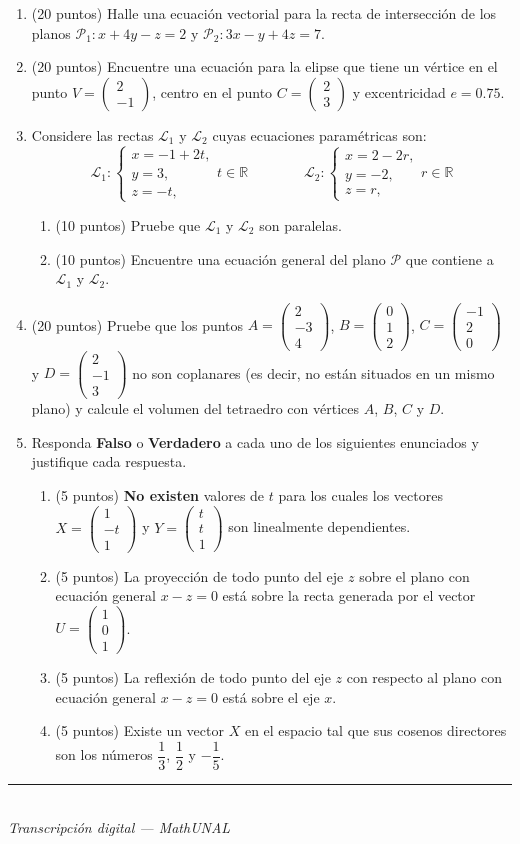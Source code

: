 \documentclass[11pt]{article}
\newcommand{\vect}[2]{\begin{pmatrix}#1\\#2\end{pmatrix}}
\newcommand{\vectiii}[3]{\begin{pmatrix}#1\\#2\\#3\end{pmatrix}}
\newcommand{\examfooter}{%
  \vfill
  \rule{\linewidth}{0.4pt}\\[1pt]
  {\scriptsize\textit{Transcripción digital --- MathUNAL}\hfill\textcolor{unalblue}{\textbf{\thepage}}}
}
\begin{document}
\begin{enumerate}
\item (20 puntos) Halle una ecuación vectorial para la recta de intersección de los planos $\mathcal{P}_1: x+4y-z=2$ y $\mathcal{P}_2: 3x-y+4z=7$.

\item (20 puntos) Encuentre una ecuación para la elipse que tiene un vértice en el punto $V=\vect{2}{-1}$, centro en el punto $C=\vect{2}{3}$ y excentricidad $e=0.75$.

\item Considere las rectas $\mathcal{L}_1$ y $\mathcal{L}_2$ cuyas ecuaciones paramétricas son:
$$\mathcal{L}_1:\begin{cases}x=-1+2t,\\ y=3,\\ z=-t,\end{cases} t\in\mathbb{R}\qquad\qquad \mathcal{L}_2:\begin{cases}x=2-2r,\\ y=-2,\\ z=r,\end{cases} r\in\mathbb{R}$$

\begin{enumerate}[label=(\alph*)]
\item (10 puntos) Pruebe que $\mathcal{L}_1$ y $\mathcal{L}_2$ son paralelas.
\item (10 puntos) Encuentre una ecuación general del plano $\mathcal{P}$ que contiene a $\mathcal{L}_1$ y $\mathcal{L}_2$.
\end{enumerate}

\item (20 puntos) Pruebe que los puntos $A=\vectiii{2}{-3}{4}$, $B=\vectiii{0}{1}{2}$, $C=\vectiii{-1}{2}{0}$ y $D=\vectiii{2}{-1}{3}$ no son coplanares (es decir, no están situados en un mismo plano) y calcule el volumen del tetraedro con vértices $A$, $B$, $C$ y $D$.

\item Responda \textbf{Falso} o \textbf{Verdadero} a cada uno de los siguientes enunciados y justifique cada respuesta.

\begin{enumerate}[label=(\alph*)]
\item (5 puntos) \textbf{No existen} valores de $t$ para los cuales los vectores $X=\vectiii{1}{-t}{1}$ y $Y=\vectiii{t}{t}{1}$ son linealmente dependientes.
\item (5 puntos) La proyección de todo punto del eje $z$ sobre el plano con ecuación general $x-z=0$ está sobre la recta generada por el vector $U=\vectiii{1}{0}{1}$.
\item (5 puntos) La reflexión de todo punto del eje $z$ con respecto al plano con ecuación general $x-z=0$ está sobre el eje $x$.
\item (5 puntos) Existe un vector $X$ en el espacio tal que sus cosenos directores son los números $\dfrac{1}{3}$, $\dfrac{1}{2}$ y $-\dfrac{1}{5}$.
\end{enumerate}

\end{enumerate}

\examfooter
\end{document}
